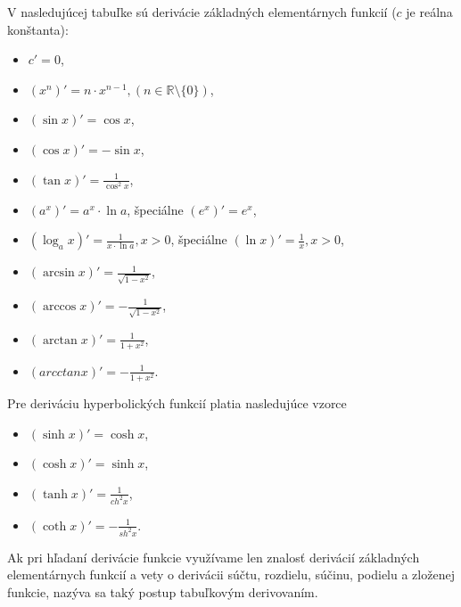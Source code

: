 V nasledujúcej tabuľke sú derivácie základných elementárnych funkcií ($c$ je
reálna konštanta):
\begin{itemize}
\item $c'=0$,
\item $(x^n)'=n\cdot x^{n-1},(n \in \mathbb{R} \setminus \{0\})$,
\item $(\sin x)'=\cos x$,
\item $(\cos x)'=-\sin x$,
\item $(\tan x)'=\frac{1}{\cos^2 x}$,
\item $(a^x)'=a^x \cdot \ln a$, špeciálne $(e^x)'=e^x$,
\item $(\log_{a} x)'=\frac{1}{x\cdot \ln a},x>0$, špeciálne $(\ln x)'=\frac{1}{x},x>0$,
\item $(\arcsin x)'=\frac{1}{\sqrt{1-x^2}}$,
\item $(\arccos x)'=-\frac{1}{\sqrt{1-x^2}}$,
\item $(\arctan x)'=\frac{1}{1+x^2}$,
\item $(arcctan x)'=-\frac{1}{1+x^2}$.
\end{itemize}

Pre deriváciu hyperbolických funkcií platia nasledujúce vzorce
\begin{multicols}{2}
\begin{itemize}
  \item $(\sinh x)'=\cosh x$,
  \item $(\cosh x)'=\sinh x$,
  \item $(\tanh x)'=\frac{1}{ch^2 x}$,
  \item $(\coth x)'=-\frac{1}{sh^2 x}$.
\end{itemize}
\end{multicols}

Ak pri hľadaní derivácie funkcie využívame len znalosť derivácií základných
elementárnych funkcií a vety o derivácii súčtu, rozdielu, súčinu, podielu a
zloženej funkcie, nazýva sa taký postup tabuľkovým derivovaním.

